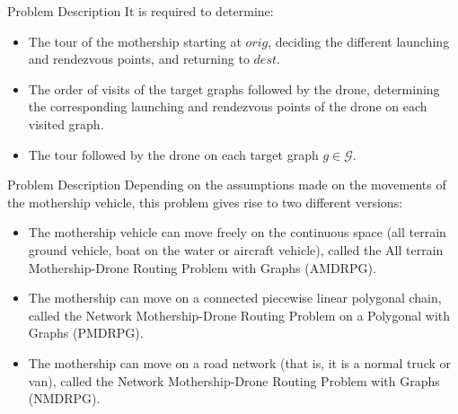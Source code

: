 \documentclass[slidestop,usepdftitle=false,10pt]{beamer}
\begin{document}
	\begin{frame}{Problem Description}
	It is required to determine:
	    \begin{itemize}
	        \item The tour of the mothership starting at $orig$, deciding the different launching and rendezvous points, and returning to $dest$.
	        \item The order of visits of the target graphs followed by the drone, determining the corresponding launching and rendezvous points of the drone on each visited graph.
	        \item The tour followed by the drone on each target graph $g \in \mathcal{G}$.
	    \end{itemize}
	\end{frame}
	
	\begin{frame}{Problem Description}
	    Depending on the assumptions made on the movements of the mothership vehicle, this problem gives rise to two different versions: 
	    \begin{itemize}
	        \item The mothership vehicle can move freely on the continuous space (all terrain ground vehicle, boat on the water or aircraft vehicle), called the All terrain Mothership-Drone Routing Problem with Graphs (AMDRPG).
	        \item The mothership can move on a connected piecewise linear polygonal chain, called the Network Mothership-Drone Routing Problem on a Polygonal with Graphs (PMDRPG).
	        \item The mothership can move on a road network (that is, it is a normal truck or van), called the Network Mothership-Drone Routing Problem with Graphs (NMDRPG).
	    \end{itemize}
	\end{frame}
	
\end{document}

